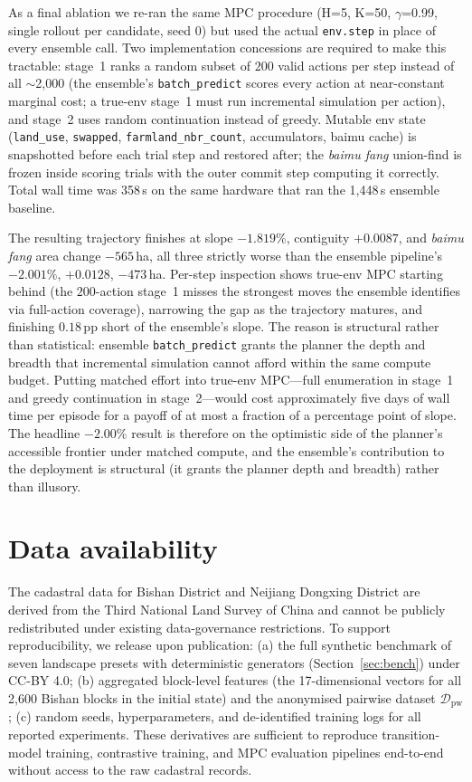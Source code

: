\documentclass[11pt]{article}
\begin{document}
As a final ablation we re-ran the same MPC procedure (H=5, K=50, $\gamma$=0.99, single rollout per candidate, seed 0) but used the actual \texttt{env.step} in place of every ensemble call. Two implementation concessions are required to make this tractable: stage~1 ranks a random subset of $200$ valid actions per step instead of all $\sim$2{,}000 (the ensemble's \texttt{batch\_predict} scores every action at near-constant marginal cost; a true-env stage~1 must run incremental simulation per action), and stage~2 uses random continuation instead of greedy. Mutable env state (\texttt{land\_use}, \texttt{swapped}, \texttt{farmland\_nbr\_count}, accumulators, baimu cache) is snapshotted before each trial step and restored after; the \textit{baimu fang} union-find is frozen inside scoring trials with the outer commit step computing it correctly. Total wall time was 358\,s on the same hardware that ran the 1{,}448\,s ensemble baseline.

The resulting trajectory finishes at slope $-1.819\%$, contiguity $+0.0087$, and \textit{baimu fang} area change $-565$\,ha, all three strictly worse than the ensemble pipeline's $-2.001\%$, $+0.0128$, $-473$\,ha. Per-step inspection shows true-env MPC starting behind (the $200$-action stage~1 misses the strongest moves the ensemble identifies via full-action coverage), narrowing the gap as the trajectory matures, and finishing $0.18$\,pp short of the ensemble's slope. The reason is structural rather than statistical: ensemble \texttt{batch\_predict} grants the planner the depth and breadth that incremental simulation cannot afford within the same compute budget. Putting matched effort into true-env MPC---full enumeration in stage~1 and greedy continuation in stage~2---would cost approximately five days of wall time per episode for a payoff of at most a fraction of a percentage point of slope. The headline $-2.00\%$ result is therefore on the optimistic side of the planner's accessible frontier under matched compute, and the ensemble's contribution to the deployment is structural (it grants the planner depth and breadth) rather than illusory.

\section*{Data availability}
The cadastral data for Bishan District and Neijiang Dongxing District are derived from the Third National Land Survey of China and cannot be publicly redistributed under existing data-governance restrictions. To support reproducibility, we release upon publication: (a) the full synthetic benchmark of seven landscape presets with deterministic generators (Section~\ref{sec:bench}) under CC-BY 4.0; (b) aggregated block-level features (the 17-dimensional vectors for all 2{,}600 Bishan blocks in the initial state) and the anonymised pairwise dataset $\mathcal{D}_{\text{pw}}$; (c) random seeds, hyperparameters, and de-identified training logs for all reported experiments. These derivatives are sufficient to reproduce transition-model training, contrastive training, and MPC evaluation pipelines end-to-end without access to the raw cadastral records.
\end{document}
